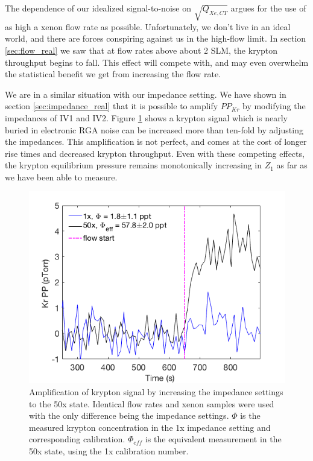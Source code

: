 The dependence of our idealized signal-to-noise on $\sqrt{Q_{Xe,CT}}$ argues for the use of as high a xenon flow rate as possible. Unfortunately, we don't live in an ideal world, and there are forces conspiring against us in the high-flow limit. In section \ref{sec:flow_real} we saw that at flow rates above about 2 SLM, the krypton throughput begins to fall. This effect will compete with, and may even overwhelm the statistical benefit we get from increasing the flow rate.

We are in a similar situation with our impedance setting. We have shown in section \ref{sec:impedance_real} that it is possible to amplify $PP_{Kr}$ by modifying the impedances of IV1 and IV2. Figure \ref{fig:ampimp} shows a krypton signal which is nearly buried in electronic RGA noise can be increased more than ten-fold by adjusting the impedances. This amplification is not perfect, and comes at the cost of longer rise times and decreased krypton throughput. Even with these competing effects, the krypton equilibrium pressure remains monotonically increasing in $Z_1$ as far as we have been able to measure.
\begin{figure}[h]
  \includegraphics[width=\linewidth]{Figures/Adjusted_impedance_study.png}
  \caption{Amplification of krypton signal by increasing the impedance settings to the 50x state. Identical flow rates and xenon samples were used with the only difference being the impedance settings. $\Phi$ is the measured krypton concentration in the 1x impedance setting and corresponding calibration. $\Phi_{eff}$ is the equivalent measurement in the 50x state, using the 1x calibration number.  }
  \label{fig:ampimp}
\end{figure}

